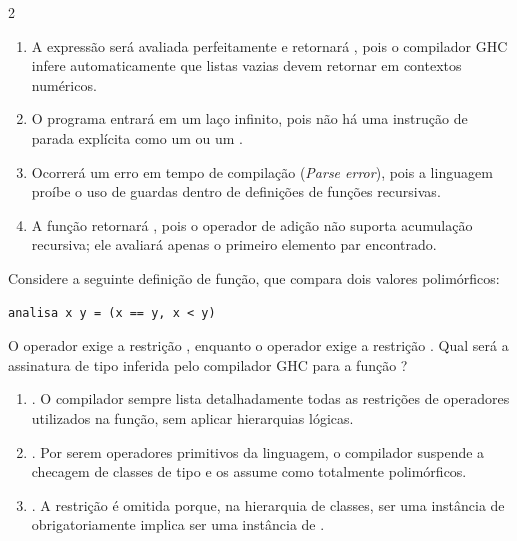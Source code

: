 \documentclass[a4paper,10pt,brazil]{article}
\begin{document}
\begin{multicols}{2}
\begin{enumerate}
  \item A expressão será avaliada perfeitamente e retornará , pois o compilador GHC infere automaticamente que listas vazias devem retornar  em contextos numéricos.

  \item O programa entrará em um laço infinito, pois não há uma instrução de parada explícita como um  ou um .

  \item Ocorrerá um erro em tempo de compilação (\emph{Parse error}), pois a linguagem proíbe o uso de guardas dentro de definições de funções recursivas.

  \item A função retornará , pois o operador de adição não suporta acumulação recursiva; ele avaliará apenas o primeiro elemento par encontrado.


\end{enumerate}

Considere a seguinte definição de função, que compara dois valores polimórficos:
\begin{verbatim}
analisa x y = (x == y, x < y)
\end{verbatim}
O operador \haskellinline{==} exige a restrição , enquanto o operador \haskellinline{<} exige a restrição . Qual será a assinatura de tipo inferida pelo compilador GHC para a função ?

\begin{enumerate}
  \item {}. O compilador sempre lista detalhadamente todas as restrições de operadores utilizados na função, sem aplicar hierarquias lógicas.

  \item {}. Por serem operadores primitivos da linguagem, o compilador suspende a checagem de classes de tipo e os assume como totalmente polimórficos.

  \item {}. A restrição  é omitida porque, na hierarquia de classes, ser uma instância de  obrigatoriamente implica ser uma instância de .


\end{enumerate}
\end{multicols}
\end{document}
